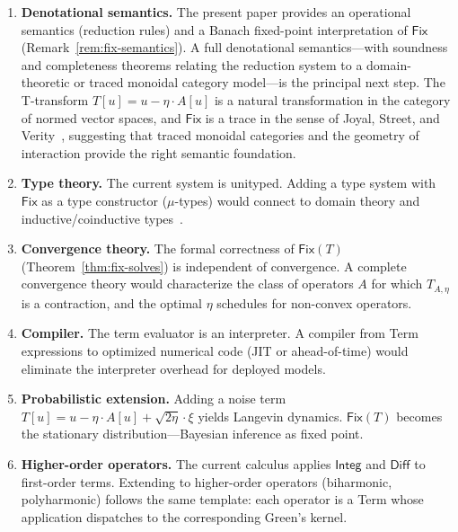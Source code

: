 \documentclass{lmcs}
\theoremstyle{plain}
\theoremstyle{definition}
\newcommand{\fix}{\mathsf{Fix}}
\begin{document}
\begin{enumerate}
\item \textbf{Denotational semantics.} The present paper provides an
  operational semantics (reduction rules) and a Banach fixed-point
  interpretation of $\fix$ (Remark~\ref{rem:fix-semantics}). A full
  denotational semantics---with soundness and completeness theorems relating
  the reduction system to a domain-theoretic or traced monoidal category
  model---is the principal next step. The T-transform $T[u] = u - \eta \cdot
  A[u]$ is a natural transformation in the category of normed vector spaces,
  and $\fix$ is a trace in the sense of Joyal, Street, and
  Verity~\cite{joyal1996}, suggesting that traced monoidal categories and the
  geometry of interaction provide the right semantic foundation.

\item \textbf{Type theory.} The current system is unityped. Adding a type
  system with $\fix$ as a type constructor ($\mu$-types) would connect to
  domain theory and inductive/coinductive types~\cite{pierce2002,harper2016}.

\item \textbf{Convergence theory.} The formal correctness of $\fix(T)$
  (Theorem~\ref{thm:fix-solves}) is independent of convergence. A complete
  convergence theory would characterize the class of operators $A$ for which
  $T_{A,\eta}$ is a contraction, and the optimal $\eta$ schedules for
  non-convex operators.

\item \textbf{Compiler.} The term evaluator is an interpreter. A compiler
  from Term expressions to optimized numerical code (JIT or ahead-of-time)
  would eliminate the interpreter overhead for deployed models.

\item \textbf{Probabilistic extension.} Adding a noise term
  $T[u] = u - \eta \cdot A[u] + \sqrt{2\eta} \cdot \xi$ yields Langevin
  dynamics. $\fix(T)$ becomes the stationary distribution---Bayesian
  inference as fixed point.

\item \textbf{Higher-order operators.} The current calculus applies
  $\mathsf{Integ}$ and $\mathsf{Diff}$ to first-order terms. Extending to
  higher-order operators (biharmonic, polyharmonic) follows the same
  template: each operator is a Term whose application dispatches to the
  corresponding Green's kernel.
\end{enumerate}
\end{document}
